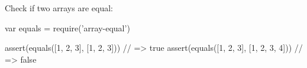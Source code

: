 Check if two arrays are equal\+:


\begin{DoxyCode}
var equals = require('array-equal')

assert(equals([1, 2, 3], [1, 2, 3])) // => true
assert(equals([1, 2, 3], [1, 2, 3, 4])) // => false
\end{DoxyCode}
 